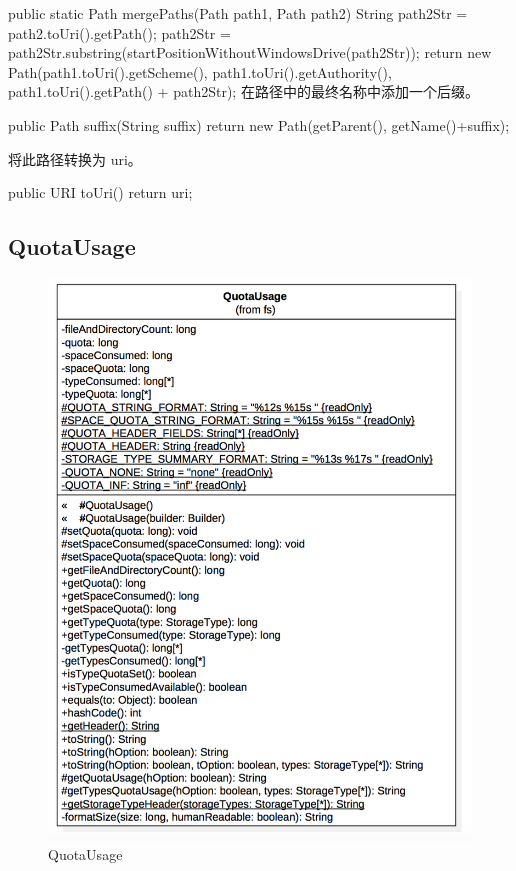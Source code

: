 \begin{java}
public static Path mergePaths(Path path1, Path path2) {
  String path2Str = path2.toUri().getPath();
  path2Str = path2Str.substring(startPositionWithoutWindowsDrive(path2Str));
  return new Path(path1.toUri().getScheme(),
      path1.toUri().getAuthority(),
      path1.toUri().getPath() + path2Str);
}
在路径中的最终名称中添加一个后缀。
\begin{java}
public Path suffix(String suffix) {
  return new Path(getParent(), getName()+suffix);
}
\end{java}
将此路径转换为 uri。
\begin{java}
public URI toUri() { return uri; }
\end{java}


\subsection{QuotaUsage}
\begin{figure}
\centering
\includegraphics[width =1\linewidth]{uml/outputstream/8.png}
\caption{QuotaUsage}
\label{fig:QuotaUsage}
\end{figure}


\end{java}
